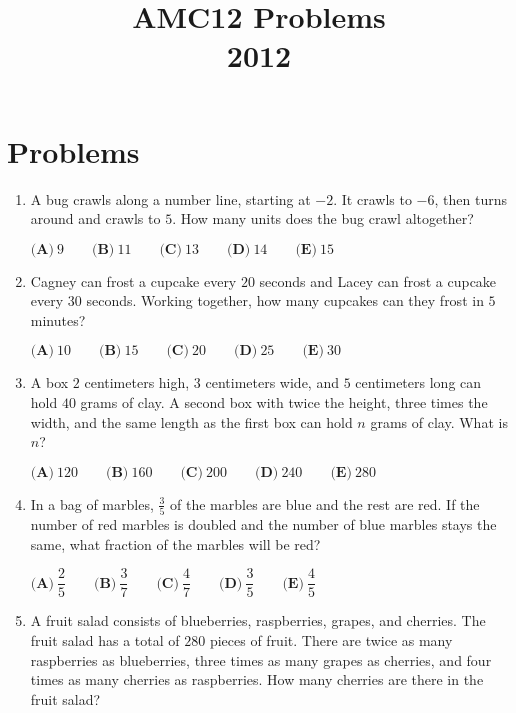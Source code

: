 \documentclass{article}
\title{AMC12 Problems \\ 2012}
\date{}
\begin{document}
\maketitle\thispagestyle{fancy}\newpage\section*{Problems}\begin{enumerate}[label=\arabic*., itemsep=0.5em]\item A bug crawls along a number line, starting at \(-2\). It crawls to \(-6\), then turns around and crawls to \(5\). How many units does the bug crawl altogether?

\( \textbf{(A)}\ 9\qquad\textbf{(B)}\ 11\qquad\textbf{(C)}\ 13\qquad\textbf{(D)}\ 14\qquad\textbf{(E)}\ 15 \)\par \vspace{0.5em}\item Cagney can frost a cupcake every \(20\) seconds and Lacey can frost a cupcake every \(30\) seconds. Working together, how many cupcakes can they frost in \(5\) minutes?

\( \textbf{(A)}\ 10\qquad\textbf{(B)}\ 15\qquad\textbf{(C)}\ 20\qquad\textbf{(D)}\ 25\qquad\textbf{(E)}\ 30 \)\par \vspace{0.5em}\item A box \(2\) centimeters high, \(3\) centimeters wide, and \(5\) centimeters long can hold \(40\) grams of clay.  A second box with twice the height, three times the width, and the same length as the first box can hold \(n\) grams of clay.  What is \(n\)?

\(\textbf{(A)}\ 120\qquad\textbf{(B)}\ 160\qquad\textbf{(C)}\ 200\qquad\textbf{(D)}\ 240\qquad\textbf{(E)}\ 280\)\par \vspace{0.5em}\item In a bag of marbles, \(\tfrac{3}{5}\) of the marbles are blue and the rest are red.  If the number of red marbles is doubled and the number of blue marbles stays the same, what fraction of the marbles will be red?

\( \textbf{(A)}\ \dfrac{2}{5}
\qquad\textbf{(B)}\ \dfrac{3}{7}
\qquad\textbf{(C)}\ \dfrac{4}{7}
\qquad\textbf{(D)}\ \dfrac{3}{5}
\qquad\textbf{(E)}\ \dfrac{4}{5}
 \)\par \vspace{0.5em}\item A fruit salad consists of blueberries, raspberries, grapes, and cherries.  The fruit salad has a total of \(280\) pieces of fruit.  There are twice as many raspberries as blueberries, three times as many grapes as cherries, and four times as many cherries as raspberries.  How many cherries are there in the fruit salad?


\end{enumerate}
\end{document}
